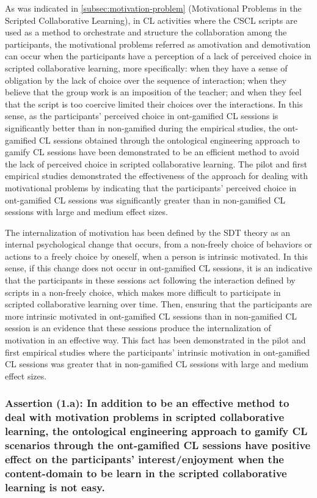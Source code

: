 As was indicated in \autoref{subsec:motivation-problem} (Motivational Problems in the Scripted Collaborative Learning), in CL activities where the CSCL scripts are used as a method to orchestrate and structure the collaboration among the participants, the motivational problems referred as amotivation and demotivation can occur when the participants have a perception of a lack of perceived choice in scripted collaborative learning, more specifically:
when they have a sense of obligation by the lack of choice over the sequence of interaction;
when they believe that the group work is an imposition of the teacher; and
when they feel that the script is too coercive limited their choices over the interactions.
In this sense, as the participants' perceived choice in ont-gamified CL sessions is significantly better than in non-gamified during the empirical studies, the ont-gamified CL sessions obtained through the ontological engineering approach to gamify CL sessions have been demonstrated to be an efficient method to avoid the lack of perceived choice in scripted collaborative learning.
The pilot and first empirical studies demonstrated the effectiveness of the approach for dealing with motivational problems by indicating that the participants' perceived choice in ont-gamified CL sessions was significantly greater than in non-gamified CL sessions with large and medium effect sizes.

The internalization of motivation has been defined by the SDT theory \cite{RyanDeci2000} as an internal psychological change that occurs, from a non-freely choice of behaviors or actions to a freely choice by oneself, when a person is intrinsic motivated.
In this sense, if this change does not occur in ont-gamified CL sessions, it is an indicative that the participants in these sessions act following the interaction defined by scripts in a non-freely choice, which makes more difficult to participate in scripted collaborative learning over time.
Then, ensuring that the participants are more intrinsic motivated in ont-gamified CL sessions than in non-gamified CL session is an evidence that these sessions produce the internalization of motivation in an effective way.
This fact has been demonstrated in the pilot and first empirical studies where the participants' intrinsic motivation in ont-gamified CL sessions was greater that in non-gamified CL sessions with large and medium effect sizes.

\subsubsection*{Assertion (1.a): In addition to be an effective method to deal with motivation problems in scripted collaborative learning, the ontological engineering approach to gamify CL scenarios through the ont-gamified CL sessions have positive effect on the participants' interest/enjoyment when the content-domain to be learn in the scripted collaborative learning is not easy.}

